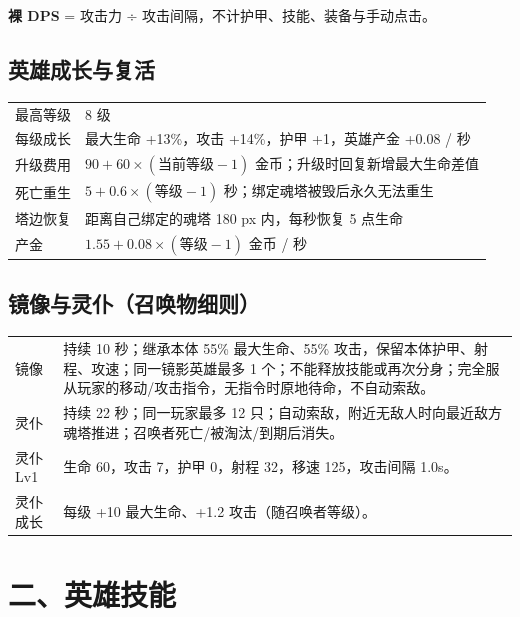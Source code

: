 \documentclass{ctexart}
\begin{document}
\vspace{2pt}
{\footnotesize \textbf{裸 DPS} = 攻击力 ÷ 攻击间隔，不计护甲、技能、装备与手动点击。}

\subsection*{英雄成长与复活}

{\footnotesize
\begin{tabularx}{\textwidth}{@{}l X@{}}
\toprule
最高等级 & 8 级 \\
每级成长 & 最大生命 +13\%，攻击 +14\%，护甲 +1，英雄产金 +0.08 / 秒 \\
升级费用 & $90 + 60 \times (\text{当前等级}-1)$ 金币；升级时回复新增最大生命差值 \\
死亡重生 & $5 + 0.6 \times (\text{等级}-1)$ 秒；绑定魂塔被毁后永久无法重生 \\
塔边恢复 & 距离自己绑定的魂塔 180 px 内，每秒恢复 5 点生命 \\
产金 & $1.55 + 0.08 \times (\text{等级}-1)$ 金币 / 秒 \\
\bottomrule
\end{tabularx}
}

\enlargethispage{2.4cm}

\subsection*{镜像与灵仆（召唤物细则）}

{\footnotesize
\begin{tabularx}{\textwidth}{@{}l X@{}}
\toprule
镜像 & 持续 10 秒；继承本体 55\% 最大生命、55\% 攻击，保留本体护甲、射程、攻速；同一镜影英雄最多 1 个；不能释放技能或再次分身；完全服从玩家的移动/攻击指令，无指令时原地待命，不自动索敌。 \\
灵仆 & 持续 22 秒；同一玩家最多 12 只；自动索敌，附近无敌人时向最近敌方魂塔推进；召唤者死亡/被淘汰/到期后消失。 \\
灵仆 Lv1 & 生命 60，攻击 7，护甲 0，射程 32，移速 125，攻击间隔 1.0s。 \\
灵仆成长 & 每级 +10 最大生命、+1.2 攻击（随召唤者等级）。 \\
\bottomrule
\end{tabularx}
}

\newpage

\section*{二、英雄技能}
\end{document}

